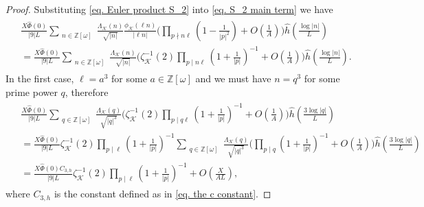 \documentclass[11pt]{amsart}
\numberwithin{equation}{section}
\theoremstyle{remark}
\begin{document}
\begin{proof}
Substituting \eqref{eq. Euler product S_2} into \eqref{eq. S_2 main term} we have
\begin{align}\label{eq. S_2 after Euler product}
\begin{split}
    &\frac{X\widehat{\Phi}(0)}{|9|L}
	\sum_{\substack{n\in \mathbb{Z}[\omega]}}
 \frac{\Lambda_\mathcal{K}(n)}{\sqrt{|n|}}  
 \frac{\phi_\mathcal{K}(\ell n)}{|\ell n|} 
\bigg(\prod_{p \nmid n\ell} \left(1-\frac{1 }{|p|^2}\right) +O\left(\frac{1}{A}\right)\bigg)
	\hat{h}\left(\frac{\log |n|}{L}\right) 
    \\
    &=
    \frac{X\widehat{\Phi}(0)}{|9|L}
	\sum_{\substack{n\in \mathbb{Z}[\omega]}}
 \frac{\Lambda_\mathcal{K}(n)}{\sqrt{|n|}}  
 \bigg(\zeta^{-1}_\mathcal{K}(2)  \prod_{p\mid n\ell}\left(1+\frac{1}{|p|}\right)^{-1} +O\left(\frac{1}{A}\right)\bigg)
	\hat{h}\left(\frac{\log |n|}{L}\right).
    \end{split}
\end{align}
In the first case, $\ell=a^3$ for some $a\in\mathbb{Z}[\omega]$ and we must have $n=q^3$ for some prime power $q$, therefore
\begin{align}
\label{eq. main term 1}
   \begin{split}
    &\frac{X\widehat{\Phi}(0)}{|9|L}
	\sum_{\substack{q\in \mathbb{Z}[\omega] }}
 \frac{\Lambda_\mathcal{K}(q)}{\sqrt{|q|^3}}  
\bigg(\zeta^{-1}_\mathcal{K}(2)  \prod_{p\mid q\ell}\left(1+\frac{1}{|p|}\right)^{-1} +O\left(\frac{1}{A}\right)\bigg)
	\hat{h}\left(\frac{3\log |q|}{L}\right)
    \\
    &= \frac{X\widehat{\Phi}(0)}{|9|L}\zeta^{-1}_\mathcal{K}(2)  \prod_{p\mid \ell}\left(1+\frac{1}{|p|}\right)^{-1}
	\sum_{\substack{q\in \mathbb{Z}[\omega] }}
 \frac{\Lambda_\mathcal{K}(q)}{\sqrt{|q|^3}}  
\bigg( \prod_{p\mid q}\left(1+\frac{1}{|p|}\right)^{-1} +O\left(\frac{1}{A}\right)\bigg)
	\hat{h}\left(\frac{3\log |q|}{L}\right)
    \\
    &=
    \frac{X\widehat{\Phi}(0)C_{3, h}}{|9|L}
    \zeta^{-1}_\mathcal{K}(2)  \prod_{p\mid \ell}\left(1+\frac{1}{|p|}\right)^{-1}
	+ O\left(\frac{X}{AL}\right),
    \end{split}
\end{align}
where $C_{3,h}$ is the constant defined as in \eqref{eq. the c constant}.



\end{proof}
\end{document}
